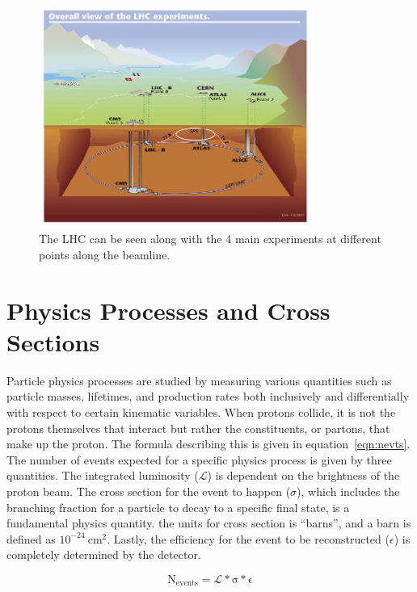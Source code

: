 \begin{figure}[!ht]
  \begin{center}
    \includegraphics[width=0.8\textwidth]{cms/figs/lhc-underground.jpeg}
    \caption{ The LHC can be seen along with the 4 main experiments at different points along the beamline.
      \label{fig:lhcunderground}
    }
  \end{center}
\end{figure}

\section{Physics Processes and Cross Sections}
Particle physics processes are studied by measuring various quantities such as particle masses,
lifetimes, and production rates both inclusively and differentially with respect to certain kinematic variables.
When protons collide,
it is not the protons themselves that interact but rather the constituents, or partons, that make up the proton.
The formula describing this is given in equation~\ref{eqn:nevts}.
The number of events expected for a specific physics process is given by three quantities.
The integrated luminosity ($\mathcal{L}$) is dependent on the brightness of the proton beam.
The cross section for the event to happen ($\sigma$),
which includes the branching fraction for a particle to decay to a specific final state,
is a fundamental physics quantity.
the units for cross section is ``barns'', and a barn is defined as $\mathrm{10^{-24}~cm^{2}}$.
Lastly, the efficiency for the event to be reconstructed ($\epsilon$) is completely determined by the detector.

\begin{equation}
\label{eqn:nevts}
  \mathrm{N_{events} = \mathcal{L} * \sigma * \epsilon}
\end{equation}

